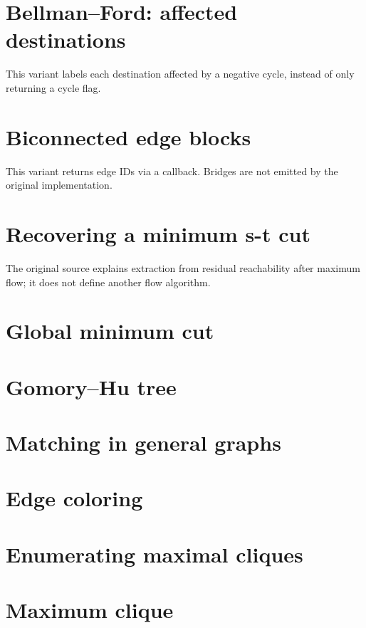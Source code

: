\section{Bellman--Ford: affected destinations}
This variant labels each destination affected by a negative cycle, instead of only returning a cycle flag.

\section{Biconnected edge blocks}
This variant returns edge IDs via a callback. Bridges are not emitted by the original implementation.

\section{Recovering a minimum s-t cut}
The original source explains extraction from residual reachability after maximum flow; it does not define another flow algorithm.

\section{Global minimum cut}

\section{Gomory--Hu tree}

\section{Matching in general graphs}

\section{Edge coloring}

\section{Enumerating maximal cliques}

\section{Maximum clique}

